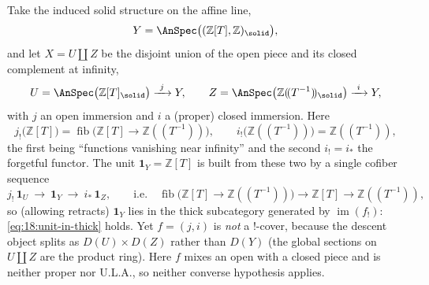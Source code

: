 \begin{example}
\label{ex:18:converse-fails}
Take the induced solid structure on the affine line,
\begin{equation*}
Y=\AnSpec\bigl((\mathbb{Z}[T],\mathbb{Z})_\solid\bigr),
\end{equation*}
and let $X=U\amalg Z$ be the disjoint union of the open piece and its closed
complement at infinity,
\begin{equation*}
U=\AnSpec\bigl(\mathbb{Z}[T]_\solid\bigr)\xrightarrow{\ j\ }Y,\qquad
Z=\AnSpec\bigl(\mathbb{Z}(\!(T^{-1})\!)_\solid\bigr)\xrightarrow{\ i\ }Y,
\end{equation*}
with $j$ an open immersion and $i$ a (proper) closed immersion. Here
\begin{equation*}
j_!\bigl(\mathbb{Z}[T]\bigr)=\operatorname{fib}\bigl(\mathbb{Z}[T]\to\mathbb{Z}(\!(T^{-1})\!)\bigr),
\qquad
i_!\bigl(\mathbb{Z}(\!(T^{-1})\!)\bigr)=\mathbb{Z}(\!(T^{-1})\!),
\end{equation*}
the first being ``functions vanishing near infinity'' and the second $i_!=i_*$ the
forgetful functor. The unit $\mathbf 1_Y=\mathbb{Z}[T]$ is built from these two by
a single cofiber sequence
\begin{equation*}
j_!\,\mathbf 1_U\ \longrightarrow\ \mathbf 1_Y\ \longrightarrow\ i_*\,\mathbf 1_Z,
\qquad\text{i.e.}\quad
\operatorname{fib}\bigl(\mathbb{Z}[T]\to\mathbb{Z}(\!(T^{-1})\!)\bigr)\to \mathbb{Z}[T]\to\mathbb{Z}(\!(T^{-1})\!),
\end{equation*}
so (allowing retracts) $\mathbf 1_Y$ lies in the thick subcategory generated by
$\operatorname{im}(f_!)$: \eqref{eq:18:unit-in-thick} holds. Yet $f=(j,i)$ is
\emph{not} a $!$-cover, because the descent object splits as $D(U)\times D(Z)$
rather than $D(Y)$ (the global sections on $U\amalg Z$ are the product ring). Here
$f$ mixes an open with a closed piece and is neither proper nor U.L.A., so neither
converse hypothesis applies.
\end{example}

